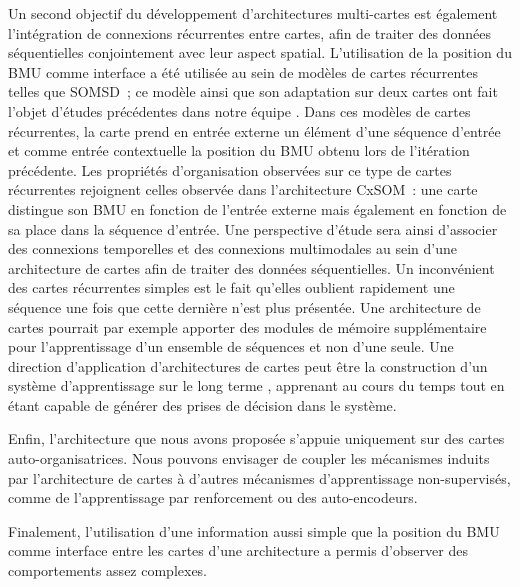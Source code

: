 Un second objectif du développement d'architectures multi-cartes est également l'intégration de connexions récurrentes entre cartes, afin de traiter des données séquentielles conjointement avec leur aspect spatial. 
L'utilisation de la position du BMU comme interface a été utilisée au sein de modèles de cartes récurrentes telles que SOMSD~; ce modèle ainsi que son adaptation sur deux cartes ont fait l'objet d'études précédentes dans notre équipe \cite{baheux_towards_2014, fix20}. 
Dans ces modèles de cartes récurrentes, la carte prend en entrée externe un élément d'une séquence d'entrée et comme entrée contextuelle la position du BMU obtenu lors de l'itération précédente.
Les propriétés d'organisation observées sur ce type de cartes récurrentes rejoignent celles observée dans l'architecture CxSOM~: une carte distingue son BMU en fonction de l'entrée externe mais également en fonction de sa place dans la séquence d'entrée.
Une perspective d'étude sera ainsi d'associer des connexions temporelles et des connexions multimodales au sein d'une architecture de cartes afin de traiter des données séquentielles.
Un inconvénient des cartes récurrentes simples est le fait qu'elles oublient rapidement une séquence une fois que cette dernière n'est plus présentée. 
Une architecture de cartes pourrait par exemple apporter des modules de mémoire supplémentaire pour l'apprentissage d'un ensemble de séquences et non d'une seule.
Une direction d'application d'architectures de cartes peut être la construction d'un système d'apprentissage \og sur le long terme \fg{}, apprenant au cours du temps tout en étant capable de générer des prises de décision dans le système.


Enfin, l'architecture que nous avons proposée s'appuie uniquement sur des cartes auto-organisatrices. Nous pouvons envisager de coupler les mécanismes induits par l'architecture de cartes à d'autres mécanismes d'apprentissage non-supervisés, comme de l'apprentissage par renforcement ou des auto-encodeurs.


Finalement, l'utilisation d'une information aussi simple que la position du BMU comme interface entre les cartes d'une architecture a permis d'observer des comportements assez complexes. 

